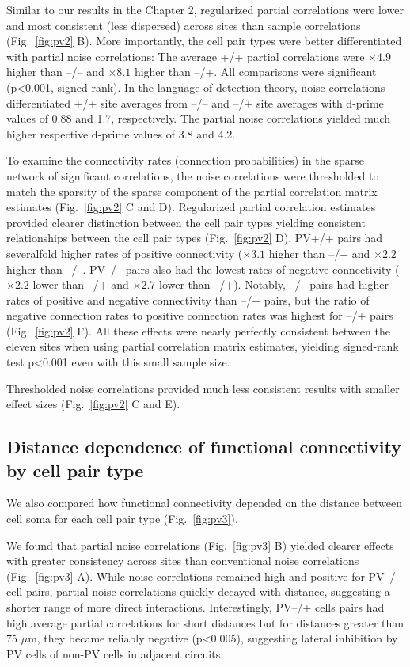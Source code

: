 Similar to our results in the Chapter 2, regularized partial correlations  were lower and most consistent (less dispersed) across sites than sample correlations (Fig.~\ref{fig:pv2} B).
More importantly, the cell pair types were better differentiated with partial noise correlations: 
The average +/+ partial correlations were $\times 4.9$ higher than --/-- and $\times 8.1$ higher than --/+.  
All comparisons were significant (p<0.001, signed rank).
In the language of detection theory, noise correlations differentiated  +/+ site averages from --/-- and --/+ site averages with d-prime values of 0.88 and 1.7, respectively. The partial noise correlations yielded much higher respective d-prime values of 3.8 and 4.2. 

To examine the connectivity rates (connection probabilities) in the sparse network of significant correlations, the noise correlations were thresholded to match the sparsity of the sparse component of the  partial correlation matrix estimates (Fig.~\ref{fig:pv2} C and D). 
Regularized partial correlation estimates provided clearer distinction between the cell pair types yielding consistent relationships between the cell pair types (Fig.~\ref{fig:pv2} D). PV+/+ pairs had severalfold higher rates of positive connectivity ($\times 3.1$ higher than --/+ and $\times 2.2$ higher than --/--. PV--/-- pairs also had the lowest rates of negative connectivity ($\times 2.2$ lower than --/+ and $\times 2.7$ lower than --/+). Notably, --/-- pairs had higher rates of positive and negative connectivity than --/+ pairs, but the ratio of negative connection rates to positive connection rates was highest for --/+ pairs (Fig.~\ref{fig:pv2} F).   All these effects were nearly perfectly consistent between the eleven sites when using partial correlation matrix estimates, yielding signed-rank test p<0.001 even with this small sample size.

Thresholded noise correlations provided much less consistent results with smaller effect sizes (Fig.~\ref{fig:pv2} C and E).

\subsection{Distance dependence of functional connectivity by cell pair type}
We also compared how functional connectivity depended on the distance between cell soma for each cell pair type (Fig.~\ref{fig:pv3}). 

We found that partial noise correlations (Fig.~\ref{fig:pv3} B)  yielded clearer effects with greater consistency across sites than conventional noise correlations (Fig.~\ref{fig:pv3} A). While noise correlations remained high and positive for PV--/-- cell pairs, partial noise correlations quickly decayed with distance, suggesting a shorter range of more direct interactions. Interestingly, PV--/+ cells pairs had high average partial correlations for short distances but for distances greater than 75 $\mu$m, they became reliably negative (p<0.005), suggesting lateral inhibition by PV cells of non-PV cells in adjacent circuits.


